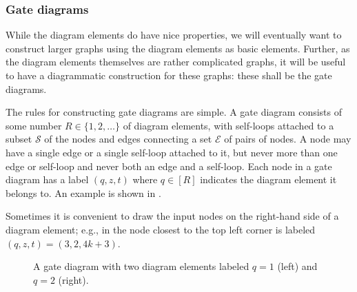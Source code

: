 \documentclass[../thesis-main/thesis-main]{subfiles}
\begin{document}
\subsubsection{Gate diagrams}\label{sec:gate_diagrams}

While the diagram elements do have nice properties, we will eventually want to construct larger graphs using the diagram elements as basic elements.  Further, as the diagram elements themselves are rather complicated graphs, it will be useful to have a diagrammatic construction for these graphs:  these shall be the gate diagrams.

The rules for constructing gate diagrams are simple. A gate diagram consists of some number $R \in \{1,2,\ldots\}$ of diagram elements, with self-loops attached to a subset $\mathcal{S}$ of the nodes and edges connecting a set $\mathcal{E}$ of pairs of nodes. A node may have a single edge or a single self-loop attached to it, but never more than one edge or self-loop and never both an edge and a self-loop. Each node in a gate diagram has a label $(q,z,t)$ where $q \in [R]$ indicates the diagram element it belongs to. An example is shown in .

Sometimes it is convenient to draw the input nodes on the right-hand side of a diagram element; e.g., in  the node closest to the top left corner is labeled $(q,z,t)=(3,2,4k+3)$.

\begin{figure}
\centering 
{}

\caption[Diagram element example]{A gate diagram with two diagram elements labeled $q=1$ (left) and $q=2$ (right).
\label{fig:simple_gate_diagram}}
\end{figure}
\end{document}
